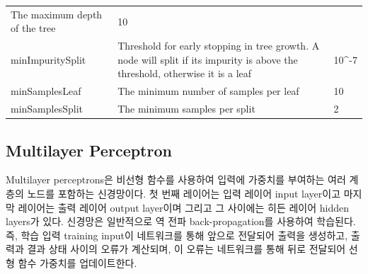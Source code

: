 \documentclass[10.5pt]{book}
\theoremstyle{definition}
\theoremstyle{definition}
\theoremstyle{definition}
\theoremstyle{remark}
\begin{document}
\begin{longtable}[]{@{}lll@{}}
\begin{minipage}[t]{0.16\columnwidth}
The maximum depth of the tree\strut
\end{minipage} & \begin{minipage}[t]{0.20\columnwidth}\raggedright\strut
10\strut
\end{minipage}\tabularnewline
\begin{minipage}[t]{0.13\columnwidth}\raggedright\strut
minImpuritySplit\strut
\end{minipage} & \begin{minipage}[t]{0.16\columnwidth}\raggedright\strut
Threshold for early stopping in tree growth. A node will split if its
impurity is above the threshold, otherwise it is a leaf\strut
\end{minipage} & \begin{minipage}[t]{0.20\columnwidth}\raggedright\strut
10\^{}-7\strut
\end{minipage}\tabularnewline
\begin{minipage}[t]{0.13\columnwidth}\raggedright\strut
minSamplesLeaf\strut
\end{minipage} & \begin{minipage}[t]{0.16\columnwidth}\raggedright\strut
The minimum number of samples per leaf\strut
\end{minipage} & \begin{minipage}[t]{0.20\columnwidth}\raggedright\strut
10\strut
\end{minipage}\tabularnewline
\begin{minipage}[t]{0.13\columnwidth}\raggedright\strut
minSamplesSplit\strut
\end{minipage} & \begin{minipage}[t]{0.16\columnwidth}\raggedright\strut
The minimum samples per split\strut
\end{minipage} & \begin{minipage}[t]{0.20\columnwidth}\raggedright\strut
2\strut
\end{minipage}\tabularnewline
\bottomrule
\end{longtable}

\subsection{Multilayer Perceptron}\label{multilayer-perceptron}

Multilayer perceptrons은 비선형 함수를 사용하여 입력에 가중치를 부여하는
여러 계층의 노드를 포함하는 신경망이다. 첫 번째 레이어는 입력 레이어
input layer이고 마지막 레이어는 출력 레이어 output layer이며 그리고 그
사이에는 히든 레이어 hidden layers가 있다. 신경망은 일반적으로 역 전파
back-propagation를 사용하여 학습된다. 즉, 학습 입력 training input이
네트워크를 통해 앞으로 전달되어 출력을 생성하고, 출력과 결과 상태 사이의
오류가 계산되며, 이 오류는 네트워크를 통해 뒤로 전달되어 선형 함수
가중치를 업데이트한다.  
\end{document}
